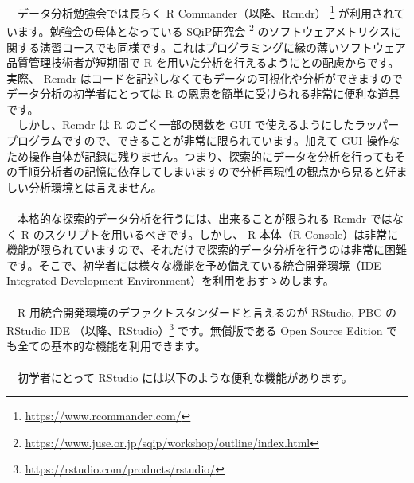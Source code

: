 \documentclass[
  12pt,
]{book}
\DeclareRobustCommand{\href}[2]{#2\footnote{\url{#1}}}
\begin{document}
　データ分析勉強会では長らく \href{https://www.rcommander.com/}{R Commander（以降、Rcmdr） } が利用されています。勉強会の母体となっている \href{https://www.juse.or.jp/sqip/workshop/outline/index.html}{SQiP研究会 } のソフトウェアメトリクスに関する演習コースでも同様です。これはプログラミングに縁の薄いソフトウェア品質管理技術者が短期間で R を用いた分析を行えるようにとの配慮からです。実際、 Rcmdr はコードを記述しなくてもデータの可視化や分析ができますのでデータ分析の初学者にとっては R の恩恵を簡単に受けられる非常に便利な道具です。\\
　しかし、Rcmdr は R のごく一部の関数を GUI で使えるようにしたラッパープログラムですので、できることが非常に限られています。加えて GUI 操作なため操作自体が記録に残りません。つまり、探索的にデータを分析を行ってもその手順分析者の記憶に依存してしまいますので分析再現性の観点から見ると好ましい分析環境とは言えません。\\
　\\
　本格的な探索的データ分析を行うには、出来ることが限られる Rcmdr ではなく R のスクリプトを用いるべきです。しかし、 R 本体（R Console）は非常に機能が限られていますので、それだけで探索的データ分析を行うのは非常に困難です。そこで、初学者には様々な機能を予め備えている統合開発環境（IDE - Integrated Development Environment）を利用をおすゝめします。\\
　\\
　R 用統合開発環境のデファクトスタンダードと言えるのが RStudio, PBC の \href{https://rstudio.com/products/rstudio/}{RStudio IDE （以降、RStudio）} です。無償版である Open Source Edition でも全ての基本的な機能を利用できます。\\
　\\
　初学者にとって RStudio には以下のような便利な機能があります。
\end{document}
